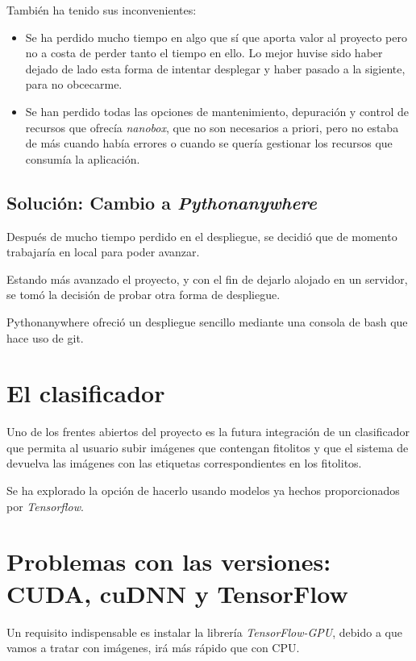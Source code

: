 También ha tenido sus inconvenientes:

\begin{itemize}
	\item Se ha perdido mucho tiempo en algo que sí que aporta valor al proyecto pero no a costa de perder tanto el tiempo en ello. Lo mejor huvise sido haber dejado de lado esta forma de intentar desplegar y haber pasado a la sigiente, para no obcecarme.
	
	\item Se han perdido todas las opciones de mantenimiento, depuración y control de recursos que ofrecía \textit{nanobox}, que no son necesarios a priori, pero no estaba de más cuando había errores o cuando se quería gestionar los recursos que consumía la aplicación.
\end{itemize}

\subsection{Solución: Cambio a \textit{Pythonanywhere}}

Después de mucho tiempo perdido en el despliegue, se decidió que de momento trabajaría en local para poder avanzar. 

Estando más avanzado el proyecto, y con el fin de dejarlo alojado en un servidor, se tomó la decisión de probar otra forma de despliegue.

Pythonanywhere ofreció un despliegue sencillo mediante una consola de bash que hace uso de git.

\section{El clasificador}

Uno de los frentes abiertos del proyecto es la futura integración de un clasificador que permita al usuario subir imágenes que contengan fitolitos y que el sistema de devuelva las imágenes con las etiquetas correspondientes en los fitolitos.

Se ha explorado la opción de hacerlo usando modelos ya hechos proporcionados por \textit{Tensorflow}.

\section{Problemas con las versiones: CUDA, cuDNN y TensorFlow}
Un requisito indispensable es instalar la librería   \textit{TensorFlow-GPU}, debido a que vamos a tratar con imágenes, irá más rápido que con CPU.

